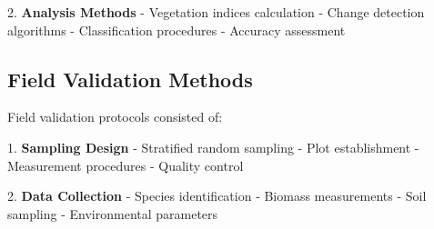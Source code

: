 \documentclass{article}
\theoremstyle{plain}
\theoremstyle{definition}
\theoremstyle{remark}
\begin{document}
2. \textbf{Analysis Methods}
   - Vegetation indices calculation
   - Change detection algorithms
   - Classification procedures
   - Accuracy assessment

\subsection{Field Validation Methods}

Field validation protocols consisted of:

1. \textbf{Sampling Design}
   - Stratified random sampling
   - Plot establishment
   - Measurement procedures
   - Quality control

2. \textbf{Data Collection}
   - Species identification
   - Biomass measurements
   - Soil sampling
   - Environmental parameters
\end{document}
